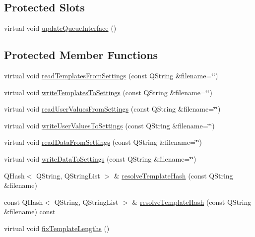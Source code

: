 \subsection*{Protected Slots}
\begin{DoxyCompactItemize}
\item 
virtual void \hyperlink{classGlobalSearch_1_1Optimizer_ad9c1899c333b7aa692bfe7ff252a6222}{update\+Queue\+Interface} ()
\end{DoxyCompactItemize}
\subsection*{Protected Member Functions}
\begin{DoxyCompactItemize}
\item 
virtual void \hyperlink{classGlobalSearch_1_1Optimizer_a2e365a82ae293c91516270f5e6534960}{read\+Templates\+From\+Settings} (const Q\+String \&filename=\char`\"{}\char`\"{})
\item 
virtual void \hyperlink{classGlobalSearch_1_1Optimizer_a9c1a95c53dcdb90dce83be3ad07ac719}{write\+Templates\+To\+Settings} (const Q\+String \&filename=\char`\"{}\char`\"{})
\item 
virtual void \hyperlink{classGlobalSearch_1_1Optimizer_a5cc22352d86ce253a0aa8d9b2ee8c951}{read\+User\+Values\+From\+Settings} (const Q\+String \&filename=\char`\"{}\char`\"{})
\item 
virtual void \hyperlink{classGlobalSearch_1_1Optimizer_afa884a475b8001a43e592f466cf2318c}{write\+User\+Values\+To\+Settings} (const Q\+String \&filename=\char`\"{}\char`\"{})
\item 
virtual void \hyperlink{classGlobalSearch_1_1Optimizer_a17b4f7c9fd176d976d652598497ff70e}{read\+Data\+From\+Settings} (const Q\+String \&filename=\char`\"{}\char`\"{})
\item 
virtual void \hyperlink{classGlobalSearch_1_1Optimizer_a115e78eb651af3e0fbb9fe188d50ecdc}{write\+Data\+To\+Settings} (const Q\+String \&filename=\char`\"{}\char`\"{})
\item 
Q\+Hash$<$ Q\+String, Q\+String\+List $>$ \& \hyperlink{classGlobalSearch_1_1Optimizer_a56df447e7eab1eb64bd66f4e3bd4594d}{resolve\+Template\+Hash} (const Q\+String \&filename)
\item 
const Q\+Hash$<$ Q\+String, Q\+String\+List $>$ \& \hyperlink{classGlobalSearch_1_1Optimizer_a139e0f44d76b023c82e48149e595cbc5}{resolve\+Template\+Hash} (const Q\+String \&filename) const 
\item 
virtual void \hyperlink{classGlobalSearch_1_1Optimizer_a8205c1cb67d2111c0a9e13e78a543f00}{fix\+Template\+Lengths} ()
\end{DoxyCompactItemize}
